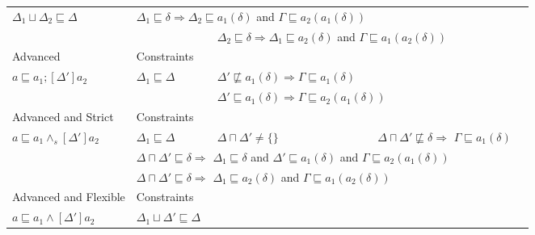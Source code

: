 \documentclass[12pt,journal,letterpaper,onecolumn]{IEEEtran}
\begin{document}
\begin{table}[h]
\begin{center}
\begin{minipage}{6in}
\begin{center}
\begin{tabular}{|p{3.2cm}|llll|}
$ \Delta_1 \sqcup \Delta_2 \sqsubseteq \Delta$ &

\multicolumn{2}{l}{$ \Delta_1 \sqsubseteq \delta \Rightarrow
\Delta_2 \sqsubseteq
a_1(\delta)$ and $\Gamma \sqsubseteq a_2(a_1(\delta))$}& \\

&& \multicolumn{2}{l}{$ \Delta_2 \sqsubseteq \delta \Rightarrow
\Delta_1 \sqsubseteq
a_2(\delta)$ and $\Gamma \sqsubseteq a_1(a_2(\delta))$} &\\

\hline
\hline Advanced &   Constraints          &&&\\
\hline

$ a \sqsubseteq a_1 ; [\Delta'] a_2$ & $ \Delta_1 \sqsubseteq \Delta
$  &

$ \Delta' \not \sqsubseteq a_1(\delta) \Rightarrow \Gamma
\sqsubseteq a_1(\delta)$ & & \\

&& \multicolumn{2}{l}{$\Delta' \sqsubseteq a_1(\delta) \Rightarrow \Gamma \sqsubseteq a_2(a_1(\delta))$}&\\

\hline \hline
Advanced and Strict & Constraints &&& \\
\hline


$ a \sqsubseteq a_1 \wedge_s [\Delta'] a_2$ &

$\Delta_1 \sqsubseteq \Delta$ & $\Delta \sqcap \Delta' \neq \{\}$
&$\Delta \sqcap \Delta' \not \sqsubseteq \delta \Rightarrow$
 $\Gamma \sqsubseteq a_1(\delta)$&\\

& \multicolumn{3}{l}{$\Delta \sqcap \Delta' \sqsubseteq \delta
\Rightarrow$
  $\Delta_1 \sqsubseteq \delta$ and $\Delta' \sqsubseteq
  a_1(\delta)$ and $\Gamma \sqsubseteq a_2(a_1(\delta))$} &\\

& \multicolumn{3}{l}{$\Delta \sqcap \Delta' \sqsubseteq \delta
\Rightarrow$
 $\Delta_1 \sqsubseteq a_2(\delta)$ and $\Gamma \sqsubseteq
 a_1(a_2(\delta))$} &\\



\hline
\hline Advanced and Flexible & Constraints &&& \\
\hline


$ a \sqsubseteq a_1 \wedge [\Delta'] a_2$ &





$\Delta_1 \sqcup \Delta' \sqsubseteq  \Delta$ &  && \\


\end{tabular}
\end{center}
\end{minipage}
\end{center}
\end{table}
\end{document}
